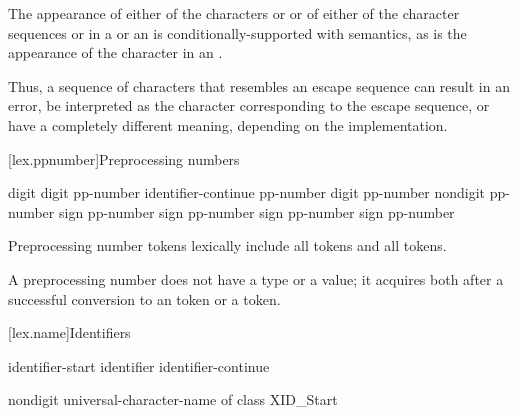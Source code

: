 \pnum
The appearance of either of the characters  or \tcode{\textbackslash} or of
either of the character sequences \tcode{/*} or \tcode{//} in a
 or an 
is conditionally-supported with  semantics, as is the appearance of the character
 in an .
\begin{footnote}
Thus, a sequence of characters
that resembles an escape sequence can result in an error, be interpreted as the
character corresponding to the escape sequence, or have a completely different meaning,
depending on the implementation.
\end{footnote}

[lex.ppnumber]{Preprocessing numbers}

%
\begin{bnf}
\br
    digit\br
     digit\br
    pp-number identifier-continue\br
    pp-number  digit\br
    pp-number  nondigit\br
    pp-number  sign\br
    pp-number  sign\br
    pp-number  sign\br
    pp-number  sign\br
    pp-number 
\end{bnf}

\pnum
Preprocessing number tokens lexically include
all  tokens and
all  tokens.

\pnum
A preprocessing number does not have a type or a value; it acquires both
after a successful conversion to
an  token or
a  token.%

[lex.name]{Identifiers}

%
\begin{bnf}
\br
    identifier-start\br
    identifier identifier-continue\br
\end{bnf}

\begin{bnf}
\br
    nondigit\br
    universal-character-name \textnormal{of class XID_Start}
\end{bnf}

